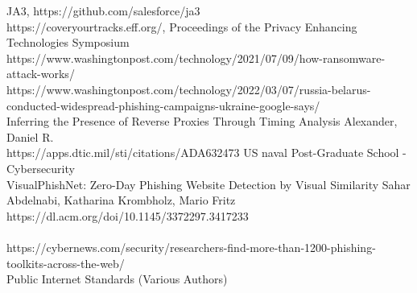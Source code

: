 \documentclass[a4paper, 11pt]{article} 				%
\begin{document}
\noindent
[14]JA3, https://github.com/salesforce/ja3\\

\noindent
[15]https://coveryourtracks.eff.org/, Proceedings of the Privacy Enhancing Technologies Symposium\\

\noindent
[16]https://www.washingtonpost.com/technology/2021/07/09/how-ransomware-attack-works/\\

\noindent
[17]https://www.washingtonpost.com/technology/2022/03/07/russia-belarus-conducted-widespread-phishing-campaigns-ukraine-google-says/\\

\noindent
[18]Inferring the Presence of Reverse Proxies Through Timing Analysis Alexander, Daniel R.\\
https://apps.dtic.mil/sti/citations/ADA632473 US naval Post-Graduate School - Cybersecurity\\

\noindent
[19]VisualPhishNet: Zero-Day Phishing Website Detection by Visual Similarity Sahar Abdelnabi, Katharina Krombholz, Mario Fritz\\
https://dl.acm.org/doi/10.1145/3372297.3417233\\

\\
https://cybernews.com/security/researchers-find-more-than-1200-phishing-toolkits-across-the-web/\\

\noindent
[-]Public Internet Standards (Various Authors)\\
\end{document}

